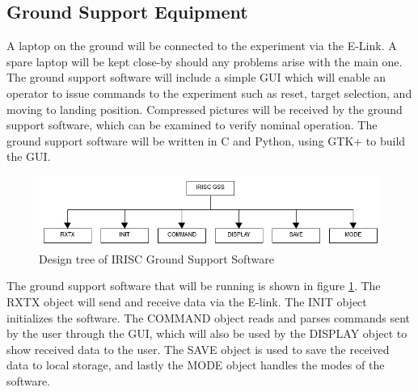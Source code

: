 \pagebreak
\subsection{Ground Support Equipment}\label{sec:4.9}
A laptop on the ground will be connected to the experiment via the E-Link. A spare laptop will be kept close-by should any problems arise with the main one. The ground support software will include a simple GUI which will enable an operator to issue commands to the experiment such as reset, target selection, and moving to landing position. Compressed pictures will be received by the ground support software, which can be examined to verify nominal operation. The ground support software will be written in C and Python, using GTK+ to build the GUI.

\begin{figure}[h]
	\centering
	\includegraphics[width=\textwidth]{4-experiment-design/img/software/GSS-tree.png}
	\caption{Design tree of IRISC Ground Support Software}
	\label{fig:gss-tree}
\end{figure}

The ground support software that will be running is shown in figure \ref{fig:gss-tree}. The RXTX object will send and receive data via the E-link. The INIT object initializes the software. The COMMAND object reads and parses commands sent by the user through the GUI, which will also be used by the DISPLAY object to show received data to the user. The SAVE object is used to save the received data to local storage, and lastly the MODE object handles the modes of the software.
\raggedbottom
